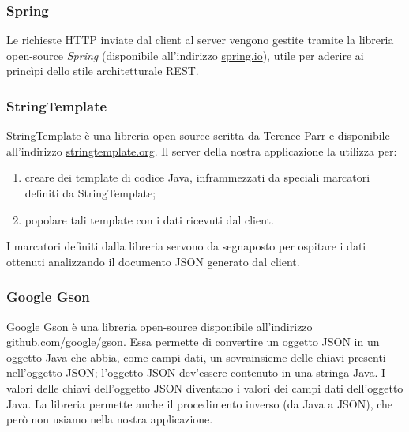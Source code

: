\subsubsection{Spring}
Le richieste HTTP inviate dal client al server vengono gestite tramite la libreria open-source \emph{Spring} (disponibile all'indirizzo \url{spring.io}), utile per aderire ai princìpi dello stile architetturale REST.

\subsubsection{StringTemplate}
StringTemplate è una libreria open-source scritta da Terence Parr e disponibile all'indirizzo \url{stringtemplate.org}. Il server della nostra applicazione la utilizza per:
\begin{enumerate}
	\item creare dei template di codice Java, inframmezzati da speciali marcatori definiti da StringTemplate;
	\item popolare tali template con i dati ricevuti dal client.
\end{enumerate}
I marcatori definiti dalla libreria servono da segnaposto per ospitare i dati ottenuti analizzando il documento JSON generato dal client.

\subsubsection{Google Gson}
Google Gson è una libreria open-source disponibile all'indirizzo \url{github.com/google/gson}. Essa permette di convertire un oggetto JSON in un oggetto Java che abbia, come campi dati, un sovrainsieme delle chiavi presenti nell'oggetto JSON; l'oggetto JSON dev'essere contenuto in una stringa Java. I valori delle chiavi dell'oggetto JSON diventano i valori dei campi dati dell'oggetto Java. La libreria permette anche il procedimento inverso (da Java a JSON), che però non usiamo nella nostra applicazione.
